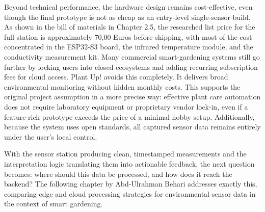 Beyond technical performance, the hardware design remains cost-effective, even though the final prototype is not as cheap as an entry-level single-sensor build. As shown in the bill of materials in Chapter 2.5, the researched list price for the full station is approximately 70,00 Euros before shipping, with most of the cost concentrated in the ESP32-S3 board, the infrared temperature module, and the conductivity measurement kit. Many commercial smart-gardening systems still go further by locking users into closed ecosystems and adding recurring subscription fees for cloud access. Plant Up! avoids this completely. It delivers broad environmental monitoring without hidden monthly costs. This supports the original project assumption in a more precise way: effective plant care automation does not require laboratory equipment or proprietary vendor lock-in, even if a feature-rich prototype exceeds the price of a minimal hobby setup. Additionally, because the system uses open standards, all captured sensor data remains entirely under the user's local control.

With the sensor station producing clean, timestamped measurements and the interpretation logic translating them into actionable feedback, the next question becomes: where should this data be processed, and how does it reach the backend? The following chapter by Abd-Ulrahman Behari addresses exactly this, comparing edge and cloud processing strategies for environmental sensor data in the context of smart gardening.
